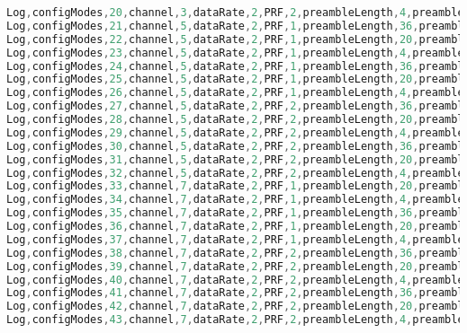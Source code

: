 \begin{lstlisting}[caption={Configurations for Measurement Plan MP\_Interference}, label={app:ConfigurationsforMeasurementPlanMPInterference}, language=C]
Log,configModes,20,channel,3,dataRate,2,PRF,2,preambleLength,4,preambleCodes,10,smartPower,1,nonStandardSFD,0
Log,configModes,21,channel,5,dataRate,2,PRF,1,preambleLength,36,preambleCodes,3,smartPower,0,nonStandardSFD,1
Log,configModes,22,channel,5,dataRate,2,PRF,1,preambleLength,20,preambleCodes,4,smartPower,0,nonStandardSFD,1
Log,configModes,23,channel,5,dataRate,2,PRF,1,preambleLength,4,preambleCodes,3,smartPower,0,nonStandardSFD,1
Log,configModes,24,channel,5,dataRate,2,PRF,1,preambleLength,36,preambleCodes,4,smartPower,0,nonStandardSFD,0
Log,configModes,25,channel,5,dataRate,2,PRF,1,preambleLength,20,preambleCodes,3,smartPower,0,nonStandardSFD,0
Log,configModes,26,channel,5,dataRate,2,PRF,1,preambleLength,4,preambleCodes,4,smartPower,0,nonStandardSFD,0
Log,configModes,27,channel,5,dataRate,2,PRF,2,preambleLength,36,preambleCodes,9,smartPower,0,nonStandardSFD,1
Log,configModes,28,channel,5,dataRate,2,PRF,2,preambleLength,20,preambleCodes,10,smartPower,0,nonStandardSFD,1
Log,configModes,29,channel,5,dataRate,2,PRF,2,preambleLength,4,preambleCodes,11,smartPower,0,nonStandardSFD,1
Log,configModes,30,channel,5,dataRate,2,PRF,2,preambleLength,36,preambleCodes,12,smartPower,1,nonStandardSFD,1
Log,configModes,31,channel,5,dataRate,2,PRF,2,preambleLength,20,preambleCodes,9,smartPower,1,nonStandardSFD,0
Log,configModes,32,channel,5,dataRate,2,PRF,2,preambleLength,4,preambleCodes,10,smartPower,1,nonStandardSFD,0
Log,configModes,33,channel,7,dataRate,2,PRF,1,preambleLength,20,preambleCodes,7,smartPower,0,nonStandardSFD,1
Log,configModes,34,channel,7,dataRate,2,PRF,1,preambleLength,4,preambleCodes,7,smartPower,0,nonStandardSFD,1
Log,configModes,35,channel,7,dataRate,2,PRF,1,preambleLength,36,preambleCodes,7,smartPower,0,nonStandardSFD,0
Log,configModes,36,channel,7,dataRate,2,PRF,1,preambleLength,20,preambleCodes,8,smartPower,0,nonStandardSFD,0
Log,configModes,37,channel,7,dataRate,2,PRF,1,preambleLength,4,preambleCodes,8,smartPower,0,nonStandardSFD,0
Log,configModes,38,channel,7,dataRate,2,PRF,2,preambleLength,36,preambleCodes,17,smartPower,0,nonStandardSFD,1
Log,configModes,39,channel,7,dataRate,2,PRF,2,preambleLength,20,preambleCodes,17,smartPower,0,nonStandardSFD,1
Log,configModes,40,channel,7,dataRate,2,PRF,2,preambleLength,4,preambleCodes,17,smartPower,0,nonStandardSFD,1
Log,configModes,41,channel,7,dataRate,2,PRF,2,preambleLength,36,preambleCodes,18,smartPower,1,nonStandardSFD,1
Log,configModes,42,channel,7,dataRate,2,PRF,2,preambleLength,20,preambleCodes,18,smartPower,1,nonStandardSFD,0
Log,configModes,43,channel,7,dataRate,2,PRF,2,preambleLength,4,preambleCodes,19,smartPower,1,nonStandardSFD,0
\end{lstlisting}

